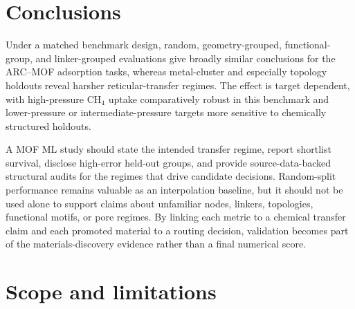 \documentclass[11pt,a4paper]{article}
\newcommand{\del}[1]{}
\begin{document}



\section*{Conclusions}
\del{This study establishes a simple but consequential principle for AI-guided MOF screening: the validation split defines the discovery claim.} Under a matched benchmark design, random, geometry-grouped, functional-group, and linker-grouped evaluations give broadly similar conclusions for the ARC--MOF adsorption tasks, whereas metal-cluster and especially topology holdouts reveal harsher reticular-transfer regimes. The effect is target dependent, with high-pressure CH$_4$ uptake comparatively robust in this benchmark and lower-pressure or intermediate-pressure targets more sensitive to chemically structured holdouts.


\del{The proposed validation framework converts this observation into a reusable standard.} A MOF ML study should state the intended transfer regime, report shortlist survival, disclose high-error held-out groups, and provide source-data-backed structural audits for the regimes that drive candidate decisions. Random-split performance remains valuable as an interpolation baseline, but it should not be used alone to support claims about unfamiliar nodes, linkers, topologies, functional motifs, or pore regimes. By linking each metric to a chemical transfer claim and each promoted material to a routing decision, validation becomes part of the materials-discovery evidence rather than a final numerical score.


\section*{Scope and limitations}
\end{document}
